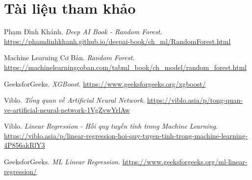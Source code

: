 \section{Tài liệu tham khảo}

\begin{thebibliography}{9}

Phạm Đình Khánh.
\textit{Deep AI Book - Random Forest}.
\url{https://phamdinhkhanh.github.io/deepai-book/ch_ml/RandomForest.html}

Machine Learning Cơ Bản.
\textit{Random Forest}.
\url{https://machinelearningcoban.com/tabml_book/ch_model/random_forest.html}

GeeksforGeeks.
\textit{XGBoost}.
\url{https://www.geeksforgeeks.org/xgboost/}

Viblo.
\textit{Tổng quan về Artificial Neural Network}.
\url{https://viblo.asia/p/tong-quan-ve-artificial-neural-network-1VgZvwYrlAw}

Viblo.
\textit{Linear Regression - Hồi quy tuyến tính trong Machine Learning}.
\url{https://viblo.asia/p/linear-regression-hoi-quy-tuyen-tinh-trong-machine-learning-4P856akRlY3}

GeeksforGeeks.
\textit{ML Linear Regression}.
\url{https://www.geeksforgeeks.org/ml-linear-regression/}

\end{thebibliography}